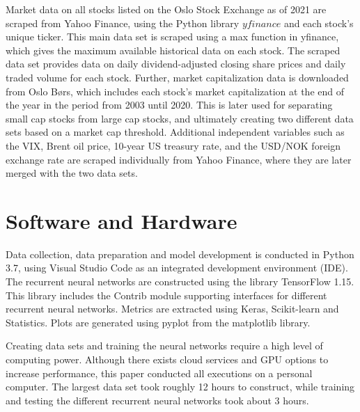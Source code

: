 Market data on all stocks listed on the Oslo Stock Exchange as of 2021 are scraped from Yahoo Finance, using the Python library $\textit{yfinance}$ and each stock's unique ticker. This main data set is scraped using a max function in yfinance, which gives the maximum available historical data on each stock. The scraped data set provides data on daily dividend-adjusted closing share prices and daily traded volume for each stock. Further, market capitalization data is downloaded from Oslo Børs, which includes each stock's market capitalization at the end of the year in the period from 2003 until 2020. This is later used for separating small cap stocks from large cap stocks, and ultimately creating two different data sets based on a market cap threshold. Additional independent variables such as the VIX, Brent oil price, 10-year US treasury rate, and the USD/NOK foreign exchange rate are scraped individually from Yahoo Finance, where they are later merged with the two data sets. 

\section{Software and Hardware}  
Data collection, data preparation and model development is conducted in Python 3.7, using Visual Studio Code as an integrated development environment (IDE). The recurrent neural networks are constructed using the library TensorFlow 1.15. This library includes the Contrib module supporting interfaces for different recurrent neural networks. Metrics are extracted using Keras, Scikit-learn and Statistics. Plots are generated using pyplot from the matplotlib library.  

\indent\newline
Creating data sets and training the neural networks require a high level of computing power. Although there exists cloud services and GPU options to increase performance, this paper conducted all executions on a personal computer. The largest data set took roughly 12 hours to construct, while training and testing the different recurrent neural networks took about 3 hours.    
